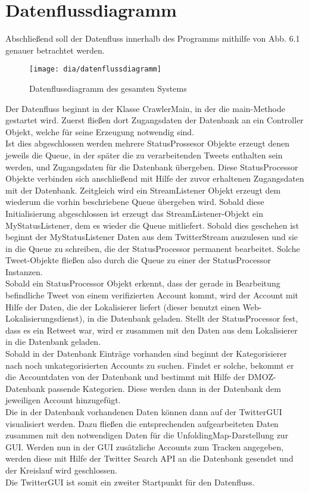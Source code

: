 \section{Datenflussdiagramm}
Abschließend soll der Datenfluss innerhalb des Programms mithilfe von Abb. 6.1 genauer betrachtet werden.

\begin{figure}[h!]
	\centering
	\texttt{[image: dia/datenflussdiagramm]}
	\caption{Datenflussdiagramm des gesamten Systems}
	\label{fig:datenflussdiagramm}
\end{figure}
Der Datenfluss beginnt in der Klasse CrawlerMain, in der die main-Methode gestartet wird. Zuerst fließen dort Zugangsdaten der Datenbank an ein Controller Objekt, welche für seine Erzeugung notwendig sind. \\
Ist dies abgeschlossen werden mehrere StatusProssesor Objekte erzeugt denen jeweils die Queue, in der später die zu verarbeitenden Tweets enthalten sein werden, und Zugangsdaten für die Datenbank übergeben. Diese StatusProcessor Objekte verbinden sich anschließend mit Hilfe der zuvor erhaltenen Zugangsdaten mit der Datenbank. Zeitgleich wird ein StreamListener Objekt erzeugt dem wiederum die vorhin beschriebene Queue übergeben wird. Sobald diese Initialisierung abgeschlossen ist erzeugt das StreamListener-Objekt ein MyStatusListener, dem es wieder die Queue mitliefert. Sobald dies geschehen ist beginnt der MyStatusListener Daten aus dem TwitterStream auszulesen und sie in die Queue zu schreiben, die der StatusProcessor permanent bearbeitet. Solche Tweet-Objekte fließen also durch die Queue zu einer der StatusProcessor Instanzen. \\
Sobald ein StatusProcessor Objekt erkennt, dass der gerade in Bearbeitung befindliche Tweet von einem verifizierten Account kommt, wird der Account mit Hilfe der Daten, die  der Lokalisierer liefert (dieser benutzt einen Web-Lokalisierungsdienst), in die Datenbank geladen. Stellt der StatusProcessor fest, dass es ein Retweet war, wird er zusammen mit den Daten aus dem Lokalisierer in die Datenbank geladen.\\
Sobald in der Datenbank Einträge vorhanden sind beginnt der Kategorisierer nach noch unkategorisierten Accounts zu suchen. Findet er solche, bekommt er die Accountdaten von der Datenbank und bestimmt mit Hilfe der DMOZ-Datenbank passende Kategorien. Diese werden dann in der Datenbank dem jeweiligen Account hinzugefügt.\\
Die in der Datenbank vorhandenen Daten können dann auf der TwitterGUI visualisiert werden. Dazu fließen die entsprechenden aufgearbeiteten Daten zusammen mit den notwendigen Daten für die UnfoldingMap-Darstellung zur GUI. Werden nun in der GUI zusätzliche Accounts zum Tracken angegeben, werden diese mit Hilfe der Twitter Search API an die Datenbank gesendet und der Kreislauf wird geschlossen.\\
Die TwitterGUI ist somit ein zweiter Startpunkt für den Datenfluss.	
